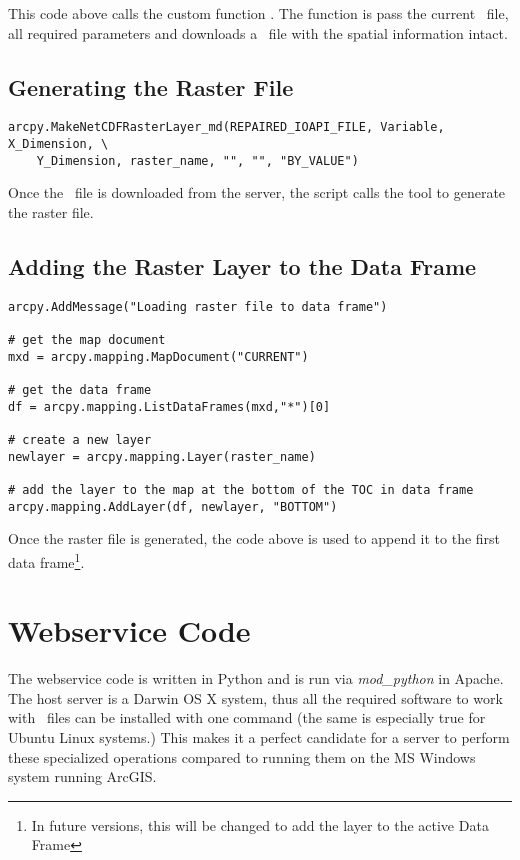 This code above calls the custom function .  The
function is pass the current \ioapi~file, all required parameters and
downloads a \netcdf~file with the spatial information intact.

\subsection{Generating the Raster File}

\singlespace
\begin{verbatim}
arcpy.MakeNetCDFRasterLayer_md(REPAIRED_IOAPI_FILE, Variable, X_Dimension, \
	Y_Dimension, raster_name, "", "", "BY_VALUE")
\end{verbatim}
\doublespace

Once the \netcdf~file is downloaded from the server, the script calls the  tool to generate the raster file.

\subsection{Adding the Raster Layer to the Data Frame}

\singlespace
\begin{verbatim}
arcpy.AddMessage("Loading raster file to data frame")

# get the map document
mxd = arcpy.mapping.MapDocument("CURRENT")

# get the data frame
df = arcpy.mapping.ListDataFrames(mxd,"*")[0]

# create a new layer
newlayer = arcpy.mapping.Layer(raster_name)

# add the layer to the map at the bottom of the TOC in data frame
arcpy.mapping.AddLayer(df, newlayer, "BOTTOM")
\end{verbatim}
\doublespace

Once the raster file is generated, the code above is used to append it
to the first data frame\footnote{In future versions, this will be
changed to add the layer to the active Data Frame}.

\section{Webservice Code}

The webservice code is written in Python and is run via
\emph{mod\_python} in Apache.  The host server is a Darwin OS X system,
thus all the required software to work with \ioapi~files can be
installed with one command (the same is especially true for Ubuntu
Linux systems.)  This makes it a perfect candidate for a server to
perform these specialized operations compared to running them on the
MS Windows system running ArcGIS.

